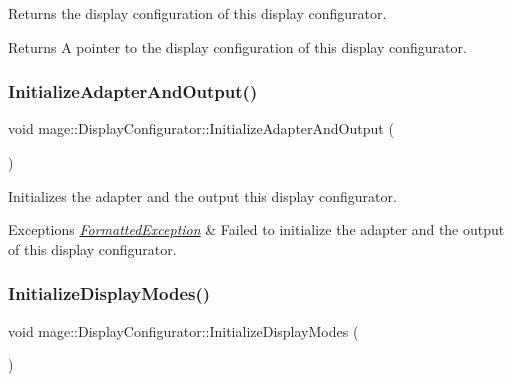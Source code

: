 Returns the display configuration of this display configurator.

\begin{DoxyReturn}{Returns}
A pointer to the display configuration of this display configurator. 
\end{DoxyReturn}
\hypertarget{classmage_1_1_display_configurator_a03fd2c38f6fdb6fbc8ff429a7d0d2a89}{}\label{classmage_1_1_display_configurator_a03fd2c38f6fdb6fbc8ff429a7d0d2a89} 
\subsubsection{\texorpdfstring{Initialize\+Adapter\+And\+Output()}{InitializeAdapterAndOutput()}}
{\footnotesize\ttfamily void mage\+::\+Display\+Configurator\+::\+Initialize\+Adapter\+And\+Output (\begin{DoxyParamCaption}{ }\end{DoxyParamCaption})\hspace{0.3cm}{\ttfamily [private]}}

Initializes the adapter and the output this display configurator.


\begin{DoxyExceptions}{Exceptions}
{\em \hyperlink{structmage_1_1_formatted_exception}{Formatted\+Exception}} & Failed to initialize the adapter and the output of this display configurator. \\
\hline
\end{DoxyExceptions}
\hypertarget{classmage_1_1_display_configurator_a90ecffb8d93768464bb1698531a34db7}{}\label{classmage_1_1_display_configurator_a90ecffb8d93768464bb1698531a34db7} 
\subsubsection{\texorpdfstring{Initialize\+Display\+Modes()}{InitializeDisplayModes()}}
{\footnotesize\ttfamily void mage\+::\+Display\+Configurator\+::\+Initialize\+Display\+Modes (\begin{DoxyParamCaption}{ }\end{DoxyParamCaption})\hspace{0.3cm}{\ttfamily [private]}}

